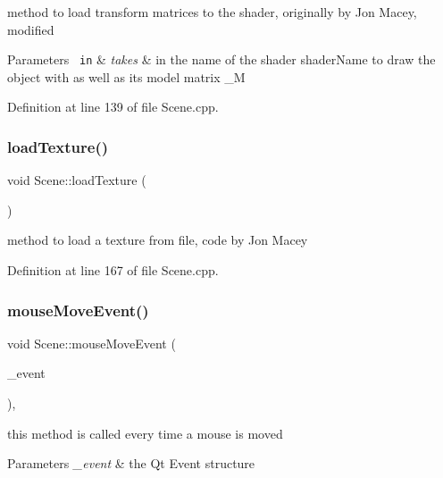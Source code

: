 method to load transform matrices to the shader, originally by Jon Macey, modified 


\begin{DoxyParams}[1]{Parameters}
\mbox{\texttt{ in}}  & {\em takes} & in the name of the shader shader\+Name to draw the object with as well as its model matrix \+\_\+M \\
\hline
\end{DoxyParams}


Definition at line 139 of file Scene.\+cpp.

\mbox{\label{class_scene_ad06c38ba83cadd6f72dc2aceb69e4873}} 
\subsubsection{loadTexture()}
{\footnotesize\ttfamily void Scene\+::load\+Texture (\begin{DoxyParamCaption}{ }\end{DoxyParamCaption})\hspace{0.3cm}{\ttfamily [private]}}



method to load a texture from file, code by Jon Macey 



Definition at line 167 of file Scene.\+cpp.

\mbox{\label{class_scene_a3d619d31300bb8deca8803b925c85baa}} 
\subsubsection{mouseMoveEvent()}
{\footnotesize\ttfamily void Scene\+::mouse\+Move\+Event (\begin{DoxyParamCaption}\item[{Q\+Mouse\+Event $\ast$}]{\+\_\+event }\end{DoxyParamCaption})\hspace{0.3cm}{\ttfamily [override]}, {\ttfamily [private]}}



this method is called every time a mouse is moved 


\begin{DoxyParams}{Parameters}
{\em \+\_\+event} & the Qt Event structure \\
\hline
\end{DoxyParams}


